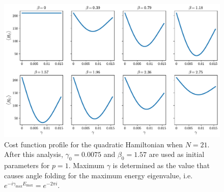 \begin{figure}[h]
    \centering
    \includegraphics[width=1\textwidth]{03-methodology/figs/costfun_landscape.pdf}
    \caption{Cost function profile for the quadratic Hamiltonian when $N=21$. After this
    analysis, $\gamma_0=0.0075$ and $\beta_0=1.57$ are used as initial parameters for $p=1$.
    Maximum $\gamma$ is determined as the value that causes angle folding for the
    maximum energy eigenvalue, i.e. $e^{-i \gamma_\mathrm{max} E_\mathrm{max}} = e^{-2\pi i}$.}
    \label{fig:costfun_landscape}
\end{figure}
